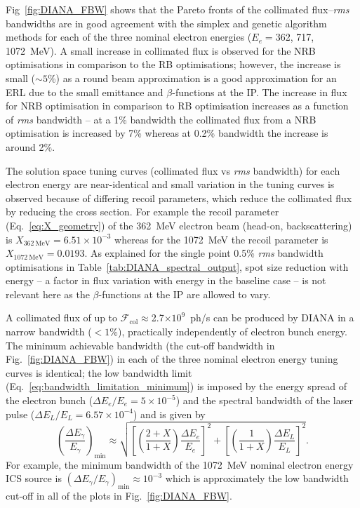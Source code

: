 \documentclass[../main.tex]{subfiles}
\begin{document}
Fig~\ref{fig:DIANA_FBW} shows that the Pareto fronts of the collimated flux--\textit{rms} bandwidths are in good agreement with the simplex and genetic algorithm methods for each of the three nominal electron energies ($E_{e}= $362, 717, 1072~\si{\mega\electronvolt}). A small increase in collimated flux is observed for the NRB optimisations in comparison to the RB optimisations; however, the increase is small ($\sim5$\%) as a round beam approximation is a good approximation for an ERL due to the small emittance and $\beta$-functions at the IP. The increase in flux for NRB optimisation in comparison to RB optimisation increases as a function of \textit{rms} bandwidth -- at a 1\% bandwidth the collimated flux from a NRB optimisation is increased by 7\% whereas at 0.2\% bandwidth the increase is around 2\%.  

The solution space tuning curves (collimated flux vs \textit{rms} bandwidth) for each electron energy are near-identical and small variation in the tuning curves is observed because of differing recoil parameters, which reduce the collimated flux by reducing the cross section. For example the recoil parameter (Eq.~\ref{eq:X_geometry}) of the 362~\si{\mega\electronvolt} electron beam (head-on, backscattering) is $X_{362~\si{\mega\electronvolt}}=6.51\times 10^{-3}$ whereas for the 1072~\si{\mega\electronvolt} the recoil parameter is $X_{1072~\si{\mega\electronvolt}}=0.0193$. As explained for the single point 0.5\% \textit{rms} bandwidth optimisations in Table~\ref{tab:DIANA_spectral_output}, spot size reduction with energy -- a factor in flux variation with energy in the baseline case -- is not relevant here as the $\beta$-functions at the IP are allowed to vary.

A collimated flux of up to $\mathcal{F}_{\mathrm{col}}\approx$2.7$\times 10^{9}$~ph/\si{\second} can be produced by DIANA in a narrow bandwidth ($<1$\%), practically independently of electron bunch energy. The minimum achievable bandwidth (the cut-off bandwidth in Fig.~\ref{fig:DIANA_FBW}) in each of the three nominal electron energy tuning curves is identical; the low bandwidth limit (Eq.~\ref{eq:bandwidth_limitation_minimum}) is imposed by the energy spread of the electron bunch ($\Delta E_{e}/E_{e} = 5\times 10^{-5}$) and the spectral bandwidth of the laser pulse ($\Delta E_{L}/E_{L}=6.57\times 10^{-4}$) and is given by   
\begin{equation*}
\left(\frac{\Delta E_{\gamma}}{E_{\gamma}}\right)_{\mathrm{min}} \approx \sqrt{\left[\left(\frac{2+X}{1+X}\right)\frac{\Delta E_{e}}{E_{e}}\right]^{2} + \left[\left(\frac{1}{1+X}\right)\frac{\Delta E_{L}}{E_{L}}\right]^{2}}.
\end{equation*}
For example, the minimum bandwidth of the 1072~\si{\mega\electronvolt} nominal electron energy ICS source is $\left(\Delta E_{\gamma}/E_{\gamma}\right)_{\mathrm{min}} \approx 10^{-3}$ which is approximately the low bandwidth cut-off in all of the plots in Fig.~\ref{fig:DIANA_FBW}. 
   
\end{document}
